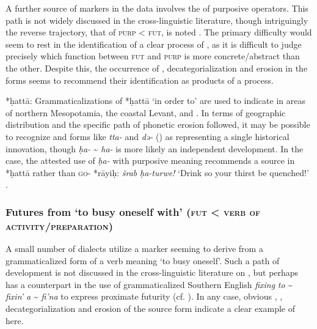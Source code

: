 \documentclass[output=paper]{langsci/langscibook}
\begin{document}
A further source of   markers in the  data involves the  of purposive operators. This path is not widely discussed in the cross-linguistic  literature, though intriguingly the reverse trajectory, that of \textsc{purp} < \textsc{fut}, is noted \citep{Bybee1994}. The primary difficulty would seem to rest in the identification of a clear process of , as it is difficult to judge precisely which function between \textsc{fut} and \textsc{purp} is more concrete/abstract than the other. Despite this, the occurrence of , decategorialization and erosion in the  forms seems to recommend their identification as products of a  process.

\begin{altdescription}
\item[*{ḥattā}:]
Grammaticalizations of *{ḥattā} ‘in order to’ are used to indicate   in areas of northern Mesopotamia, the coastal Levant, and . In terms of geographic distribution and the specific path of phonetic erosion followed, it may be possible to recognize  and  forms like  \textit{tta-} and  \textit{də-} (\citealt{Jastrow1979,Borg1985}) as representing a single historical innovation, though  \textit{ḥa-} {\textasciitilde} \textit{ha-} is more likely an independent development. In the  case, the attested use of \textit{ḥa-} with purposive meaning recommends a source in *ḥattā rather than \textsc{go}{}- *rāyiḥ: \textit{šrab} \textit{ḥa-turwe!} ‘Drink so your thirst be quenched!’ \citep[276]{Reinhardt1894}.
\end{altdescription}

\subsubsection{Futures from ‘to busy oneself with’ (\textsc{fut} < \textsc{verb} \textsc{of} \textsc{activity/preparation})}

A small number of  dialects utilize a   marker seeming to derive from a grammaticalized form of a verb meaning ‘to busy oneself’. Such a path of development is not discussed in the cross-linguistic literature on , but perhaps has a counterpart in the use of grammaticalized {Southern}  {English} \textit{fixing} \textit{to} {\textasciitilde} \textit{fixin’} \textit{a} {\textasciitilde} \textit{fi’na} to express proximate futurity (cf. \citealt{Wolfram1998}). In any case, obvious , , decategorialization and erosion of the source form indicate a clear example of  here.
\end{document}
